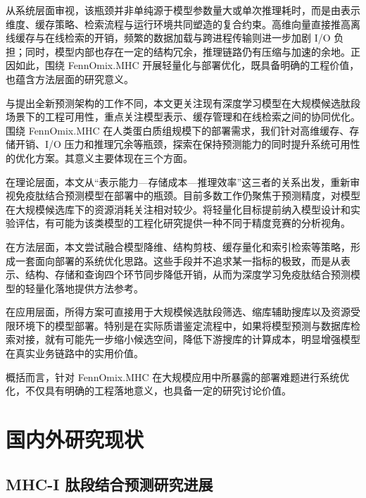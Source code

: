 

从系统层面审视，该瓶颈并非单纯源于模型参数量大或单次推理耗时，而是由表示维度、缓存策略、检索流程与运行环境共同塑造的复合约束。高维向量直接推高离线缓存与在线检索的开销，频繁的数据加载与跨进程传输则进一步加剧 I/O 负担；同时，模型内部也存在一定的结构冗余，推理链路仍有压缩与加速的余地。正因如此，围绕 FennOmix.MHC 开展轻量化与部署优化，既具备明确的工程价值，也蕴含方法层面的研究意义。

与提出全新预测架构的工作不同，本文更关注现有深度学习模型在大规模候选肽段场景下的工程可用性，重点关注模型表示、缓存管理和在线检索之间的协同优化。围绕 FennOmix.MHC 在人类蛋白质组规模下的部署需求，我们针对高维缓存、存储开销、I/O 压力和推理冗余等瓶颈，探索在保持预测能力的同时提升系统可用性的优化方案。其意义主要体现在三个方面。

在理论层面，本文从“表示能力—存储成本—推理效率”这三者的关系出发，重新审视免疫肽结合预测模型在部署中的瓶颈。目前多数工作仍聚焦于预测精度，对模型在大规模候选库下的资源消耗关注相对较少。将轻量化目标提前纳入模型设计和实验评估，有可能为该类模型的工程化研究提供一种不同于精度竞赛的分析视角\cite{li2023model}。

在方法层面，本文尝试融合模型降维、结构剪枝、缓存量化和索引检索等策略，形成一套面向部署的系统优化思路。这些手段并不追求某一指标的极致，而是从表示、结构、存储和查询四个环节同步降低开销，从而为深度学习免疫肽结合预测模型的轻量化落地提供方法参考。

在应用层面，所得方案可直接用于大规模候选肽段筛选、缩库辅助搜库以及资源受限环境下的模型部署。特别是在实际质谱鉴定流程中，如果将模型预测与数据库检索对接，就有可能先一步缩小候选空间，降低下游搜库的计算成本，明显增强模型在真实业务链路中的实用价值。

概括而言，针对 FennOmix.MHC 在大规模应用中所暴露的部署难题进行系统优化，不仅具有明确的工程落地意义，也具备一定的研究讨论价值。

\section{国内外研究现状}

\subsection{MHC-I 肽段结合预测研究进展}

